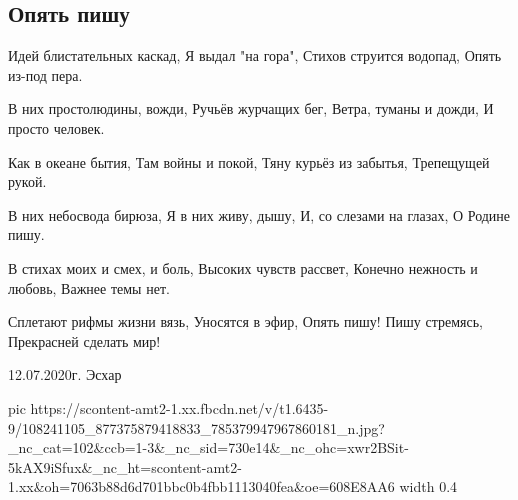  
 
 
 
 

\subsection{Опять пишу}

Идей блистательных каскад,
Я выдал "на гора",
Стихов струится водопад,
Опять из-под пера.

В них простолюдины, вожди,
Ручьёв журчащих бег,
Ветра, туманы и дожди,
И просто человек.

Как в океане бытия,
Там войны и покой,
Тяну курьёз из забытья,
Трепещущей рукой.

В них небосвода бирюза,
Я в них живу, дышу,
И, со слезами на глазах,
О Родине пишу.

В стихах моих и смех, и боль,
Высоких чувств рассвет,
Конечно нежность и любовь,
Важнее темы нет.

Сплетают рифмы жизни вязь,
Уносятся в эфир,
Опять пишу! Пишу стремясь,
Прекрасней сделать мир!

12.07.2020г. Эсхар

\ifcmt
  pic https://scontent-amt2-1.xx.fbcdn.net/v/t1.6435-9/108241105_877375879418833_785379947967860181_n.jpg?_nc_cat=102&ccb=1-3&_nc_sid=730e14&_nc_ohc=xwr2BSit-5kAX9iSfux&_nc_ht=scontent-amt2-1.xx&oh=7063b88d6d701bbc0b4fbb1113040fea&oe=608E8AA6
  width 0.4
\fi

